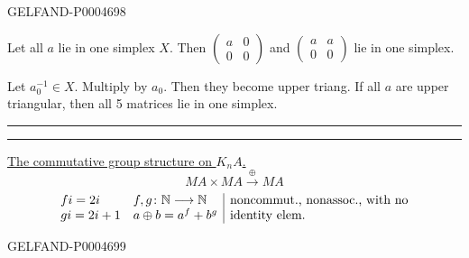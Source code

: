 \begin{GelfandAdjacentEvidence}{GELFAND-P000469}{8}


Let all $a$ lie in one simplex $X$.
Then $\begin{pmatrix}a&0\\0&0\end{pmatrix}$ and
$\begin{pmatrix}a&a\\0&0\end{pmatrix}$ lie in one simplex.

Let $a_0^{-1}\in X$. Multiply by $a_0$. Then they become upper triang.
If all $a$ are upper triangular, then all 5 matrices lie in one simplex.

{\centering\rule{3em}{.4pt}\quad\textperiodcentered\quad\rule{3.5em}{.4pt}\par}
\uline{The commutative group structure on \mbox{$K_nA$}.}
\[
MA\times MA\xrightarrow{\oplus}MA
\]
\[
\begin{array}{@{}ll|l@{}}
fi=2i & f,g\colon\mathbb N\longrightarrow\mathbb N & \text{noncommut., nonassoc., with no}\\
gi=2i+1 & a\oplus b=a^f+b^g & \text{identity elem.}
\end{array}
\]
\end{GelfandAdjacentEvidence}
\begin{GelfandAdjacentEvidence}{GELFAND-P000469}{9}


\end{GelfandAdjacentEvidence}



